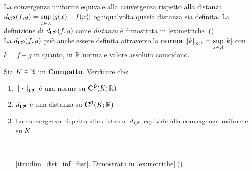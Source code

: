 \begin{observation}
	\label{obs:dist_conv_unif}
	La convergenza uniforme equivale alla convergenza rispetto alla distanza $d_{\mathbf{C^{0}}}(f,g)=\sup\limits_{x\in A}\left|g(x)-f(x)\right|$ ogniqualvolta questa distanza sia definita. La definizione di $d_{\mathbf{C^{0}}}(f,g)$ come \textit{distanza} è dimostrata in \hyperref[ex:dim_dist_conv_unif]{\cref*{ex:metriche} ()}\\
	La $d_{\mathbf{C^{0}}}(f,g)$ può anche essere definita attraverso la \textbf{norma} $\left\|k\right\|_{\mathbf{C^{0}}}=\sup\limits_{x\in A}\left|k\right|$ con $k = f-g$ in quanto, in $\mathbb{R}$ norma e valore assoluto coincidono.
\end{observation}
\begin{exercise}
	\label{ex:dim_dist_inf}
	Sia $K \in \mathbb{R}$ un \textbf{Compatto}. Verificare che:
	\begin{enumerate}
		\item $\left\|\;\cdot\;\right\|_{\mathbf{C^{0}}}$ è una norma su $\mathbf{C^{0}}(K; \mathbb{R})$
		\item \label{itm:dim_dist_inf_dist} $d_{\mathbf{C^{0}}}$ è una distanza su $\mathbf{C^{0}}(K; \mathbb{R})$
		\item La convergenza rispetto alla distanza $d_{\mathbf{C^{0}}}$ equivale alla convergenza uniforme su $K$
	\end{enumerate}
	\begin{solution}~
		\begin{enumerate}
			\item[\ref{itm:dim_dist_inf_dist}.] Dimostrata in \hyperref[ex:dim_dist_conv_unif]{\cref*{ex:metriche} ()}
		\end{enumerate}
	\end{solution}
\end{exercise}
